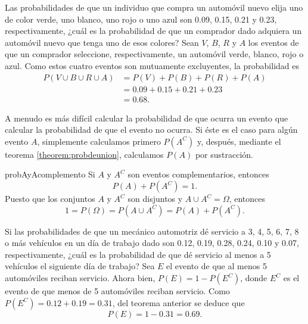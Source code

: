 \begin{examplebox}{}{}
    Las probabilidades de que un individuo que compra un automóvil nuevo elija uno de color verde, uno blanco, uno rojo o uno azul son 0.09, 0.15, 0.21 y 0.23, respectivamente, ¿cuál es la probabilidad de que un comprador dado adquiera un automóvil nuevo que tenga uno de esos colores?
    \tcblower
    \solucion Sean $V$, $B$, $R$ y $A$ los eventos de que un comprador seleccione, respectivamente, un automóvil verde, blanco, rojo o azul. Como estos cuatro eventos son mutuamente excluyentes, la probabilidad es
    \begin{align*}
        P(V \cup B \cup R \cup A) & = P(V) + P(B) + P(R) + P(A) \\
        & = 0.09 + 0.15 + 0.21 + 0.23 \\
        & = 0.68.
    \end{align*}
\end{examplebox}

A menudo es más difícil calcular la probabilidad de que ocurra un evento que calcular la probabilidad de que el evento no ocurra. Si éste es el caso para algún evento $A$, simplemente calculamos primero $P\left(A^C\right)$ y, después, mediante el teorema \ref{theorem:probdeunion}, calculamos $P(A)$ por sustracción.

\begin{theorem}{}{probAyAcomplemento}
    Si $A$ y $A^C$ son eventos complementarios, entonces
    $$P(A) + P\left(A^C\right) = 1.$$
    \tcblower
    \demostracion Puesto que los conjuntos $A$ y $A^C$ son disjuntos y $A \cup A^C = \Omega$, entonces
    $$1 = P(\Omega) = P\left(A \cup A^C\right) = P(A) + P\left(A^C\right).$$
\end{theorem}

\begin{examplebox}{}{}
    Si las probabilidades de que un mecánico automotriz dé servicio a 3, 4, 5, 6, 7, 8 o más vehículos en un día de trabajo dado son 0.12, 0.19, 0.28, 0.24, 0.10 y 0.07, respectivamente, ¿cuál es la probabilidad de que dé servicio al menos a 5 vehículos el siguiente día de trabajo?
    \tcblower
    \solucion Sea $E$ el evento de que al menos 5 automóviles reciban servicio. Ahora bien, $P(E) = 1 - P\left(E^C\right)$, donde $E^C$ es el evento de que menos de 5 automóviles reciban servicio. Como $P\left(E^C\right) = 0.12 + 0.19 = 0.31$,
    del teorema anterior se deduce que
    $$P(E) = 1 - 0.31 = 0.69.$$
\end{examplebox}

\newpage

